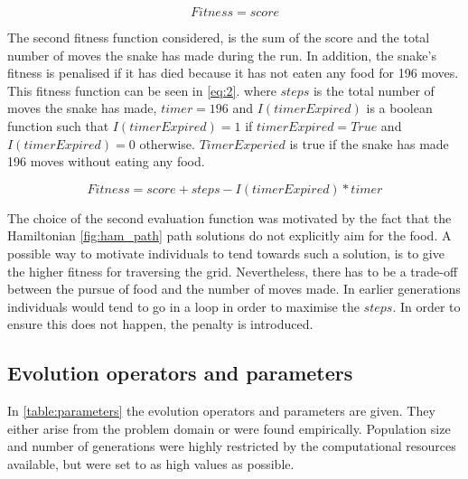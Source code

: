 \documentclass[12pt,a4paper]{article}
\begin{document}
	\begin{equation} \label{eq:1}
		Fitness = score
	\end{equation}
	
	The second fitness function considered, is the sum of the score and the total number of moves the snake has made during the run. In addition, the snake's fitness is penalised if it has died because it has not eaten any food for 196 moves. This fitness function can be seen in \autoref{eq:2}. where $steps$ is the total number of moves the snake has made, $timer=196$ and $I(timerExpired)$ is a boolean function such that $I(timerExpired) = 1$ if $timerExpired=True$ and $I(timerExpired)=0$ otherwise. $TimerExperied$ is true if the snake has made 196 moves without eating any food.
	
	\begin{equation} \label{eq:2}
		Fitness = score + steps - I(timerExpired) * timer
	\end{equation}
	
	The choice of the second evaluation function was motivated by the fact that the Hamiltonian \autoref{fig:ham_path} path solutions do not explicitly aim for the food. A possible way to motivate individuals to tend towards such a solution, is to give the higher fitness for traversing the grid. Nevertheless, there has to be a trade-off between the pursue of food and the number of moves made. In earlier generations individuals would tend to go in a loop in order to maximise the $steps$. In order to ensure this does not happen, the penalty is introduced.
	
	\subsection{Evolution operators and parameters}
	In \autoref{table:parameters} the evolution operators and parameters are given. They either arise from the problem domain or were found empirically. Population size and number of generations were highly restricted by the computational resources available, but were set to as high values as possible.  
\end{document}
